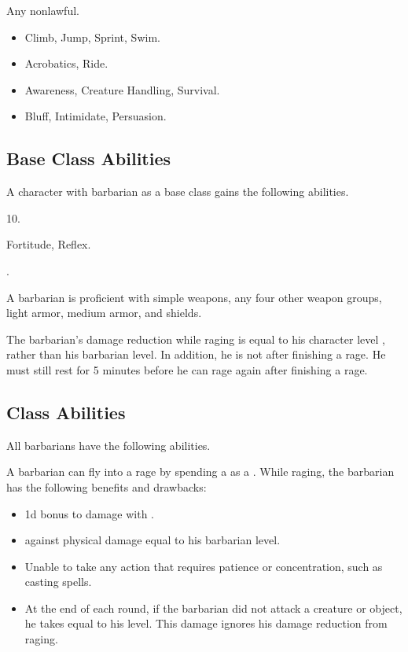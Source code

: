      Any nonlawful.

    \begin{itemize}
        \item {} Climb, Jump, Sprint, Swim.
        \item {} Acrobatics, Ride.
        \item {} Awareness, Creature Handling, Survival.
        \item {} Bluff, Intimidate, Persuasion.
    \end{itemize}

    \subsection{Base Class Abilities}
        A character with barbarian as a base class gains the following abilities.

         10.

          Fortitude,  Reflex.

         .

        A barbarian is proficient with simple weapons, any four other weapon groups, light armor, medium armor, and shields.

        The barbarian's damage reduction while raging is equal to his character level , rather than his barbarian level.
        In addition, he is not \fatigued after finishing a rage.
        He must still rest for 5 minutes before he can rage again after finishing a rage.

    \subsection{Class Abilities}
        All barbarians have the following abilities.

        \label{Rage}
        A barbarian can fly into a rage by spending a  as a .
        While raging, the barbarian has the following benefits and drawbacks:
        \begin{itemize}
            \item \plus1d bonus to damage with .
            \item {} against physical damage equal to his barbarian level.
            \item Unable to take any action that requires patience or concentration, such as casting spells.
            \item At the end of each round, if the barbarian did not attack a creature or object, he takes  equal to his level.
                This damage ignores his damage reduction from raging.
        \end{itemize}

